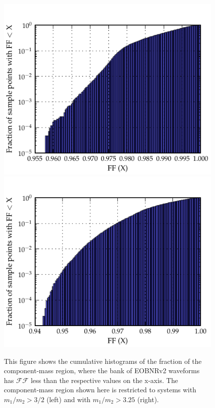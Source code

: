 \documentclass[aps,
prd,
amsmath,
amssymb,
twocolumn,
floatfix,
groupedaddress]{revtex4-1}
\newcommand{\FF}{\mathcal{FF}}
\begin{document}
\begin{figure}
\centerline{
\includegraphics[scale=0.04, clip=false,keepaspectratio=true, width=\columnwidth]{EOBHMvsEOB22cutcumhist1-5.pdf}
\includegraphics[scale=0.04, clip=false, keepaspectratio=true, width=\columnwidth]{EOBHMvsEOB22cutcumhist3-25.pdf}
}
\caption{\label{fig:cumhist_eob22eobhm_cuteta23}This figure shows the cumulative histograms of the fraction of the component-mass region, where the bank of EOBNRv2 waveforms has $\FF$ less than the respective values on the x-axis. The component-mass region shown here is restricted to systems with $m_1/m_2>3/2$ (left) and with $m_1/m_2>3.25$ (right).}
\end{figure}
\end{document}
